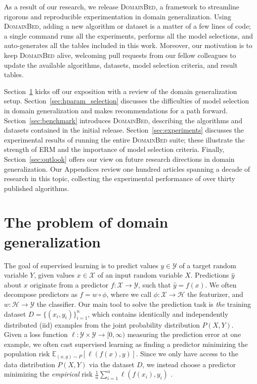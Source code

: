 \documentclass{article}
\newcommand{\domainbed}{\textsc{DomainBed}\xspace}
\begin{document}
As a result of our research, we release \domainbed, a framework to streamline rigorous and reproducible experimentation in domain generalization.
%
Using \domainbed, adding a new algorithm or dataset is a matter of a few lines of code; a single command runs all the experiments, performs all the model selections, and auto-generates all the tables included in this work.
%
Moreover, our motivation is to keep \domainbed alive, welcoming pull requests from our fellow colleagues to update the available algorithms, datasets, model selection criteria, and result tables. 

Section~\ref{sec:setup} kicks off our exposition with a review of the domain generalization setup.
%
Section~\ref{sec:hparam_selection} discusses the difficulties of model selection in domain generalization and makes recommendations for a path forward.
%
Section~\ref{sec:benchmark} introduces \domainbed, describing the algorithms and datasets contained in the initial release.
%
Section~\ref{sec:experiments} discusses the experimental results of running the entire \domainbed suite; these illustrate the strength of ERM and the importance of model selection criteria.
%
Finally, Section~\ref{sec:outlook} offers our view on future research directions in domain generalization.
%
Our Appendices review one hundred articles spanning a decade of research in this topic, collecting the experimental performance of over thirty published algorithms.

\section{The problem of domain generalization}
\label{sec:setup}

The goal of supervised learning is to predict values $y \in \mathcal{Y}$ of a target random variable $Y$, given values $x \in \mathcal{X}$ of an input random variable $X$.
%
Predictions $\hat{y}$ about $x$ originate from a predictor $f : \mathcal{X} \to \mathcal{Y}$, such that $\hat{y} = f(x)$.
%
We often decompose predictors as $f = w \circ \phi$, where we call $\phi : \mathcal{X} \to \mathcal{H}$ the featurizer, and $w : \mathcal{H} \to \mathcal{Y}$ the classifier.
%
Our main tool to solve the prediction task is \emph{the} training dataset $D = \{(x_i, y_i)\}_{i=1}^n$, which contains identically and independently distributed (iid) examples from the joint probability distribution $P(X, Y)$.
%
Given a loss function $\ell : \mathcal{Y} \times \mathcal{Y} \to [0, \infty)$ measuring the prediction error at one example, we often cast supervised learning as finding a predictor minimizing the population risk $\mathbb{E}_{(x, y) \sim P}[\ell(f(x), y)]$.
%
Since we only have access to the data distribution $P(X, Y)$ via the dataset $D$, we instead choose a predictor minimizing the \emph{empirical} risk $\frac{1}{n} \sum_{i=1}^n \ell(f(x_i), y_i)$
\citep{vapnik1998statistical}.
\end{document}
